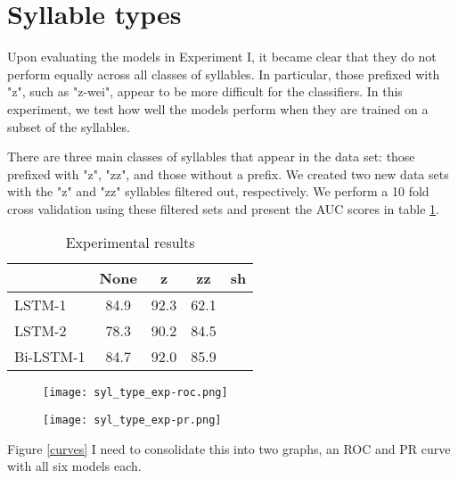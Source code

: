 \section{Syllable types}
Upon evaluating the models in Experiment I, it became clear that they do not perform equally across all classes of syllables. In particular, those prefixed with "z", such as "z-wei", appear to be more difficult for the classifiers. In this experiment, we test how well the models perform when they are trained on a subset of the syllables.

There are three main classes of syllables that appear in the data set: those prefixed with "z", "zz", and those without a prefix. We created two new data sets with the "z" and "zz" syllables filtered out, respectively. We perform a 10 fold cross validation using these filtered sets and present the AUC scores in table \ref{tab-syl-type-results}. 

\begin{table}[h]
\centering
\caption{Experimental results}
\begin{tabular}{|l|c|c|c|c|}
\hline
\multicolumn{1}{|c|}{}      &   None       &   z          &     zz      &    sh       \\ \hline
LSTM-1                      &   84.9     &   92.3    &     62.1  &             \\ \hline
LSTM-2                      &   78.3     &   90.2     &     84.5  &             \\ \hline
Bi-LSTM-1                   &   84.7     &   92.0     &     85.9  &             \\ \hline
\end{tabular}
\label{tab-syl-type-results}
\end{table}

\begin{figure*}[t]
    \centering
    \begin{subfigure}[b]{\columnwidth}
        \texttt{[image: syl\_type\_exp-roc.png]}
        \caption{}
        \label{rfidtest_xaxis}
    \end{subfigure}
    \begin{subfigure}[b]{\columnwidth}
        \texttt{[image: syl\_type\_exp-pr.png]}
        \caption{}
        \label{rfidtest_yaxis}
    \end{subfigure}
\end{figure*}

Figure \ref{curves} I need to consolidate this into two graphs, an ROC and PR curve with all six models each.  

